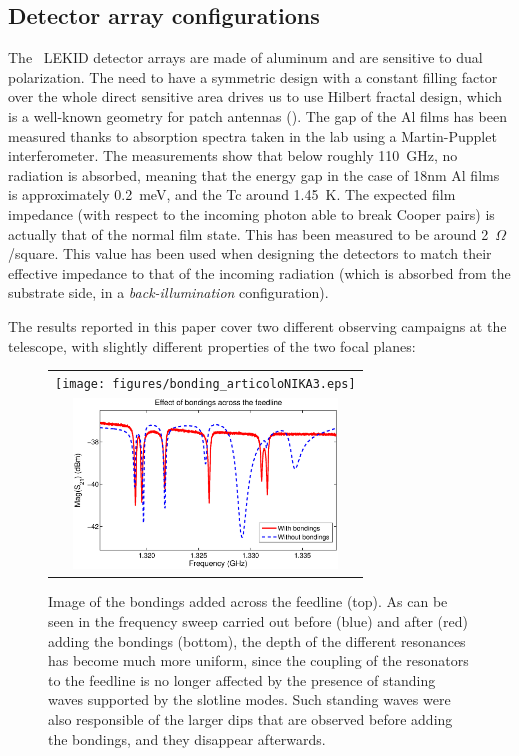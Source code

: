 %

\subsection{Detector array configurations}\label{dac}
The \NIKA\ LEKID detector arrays are made of aluminum and are sensitive to dual polarization. The need to have a symmetric design with a constant filling factor over the whole direct sensitive area drives us to use Hilbert fractal design, which is a well-known geometry for patch antennas (\cite{Roesch2012}). The gap of the Al films has been measured thanks to absorption spectra taken in the lab using a Martin-Pupplet interferometer. The measurements show that below roughly 110~GHz, no radiation is absorbed, meaning that the energy gap in the case of 18nm Al films is approximately 0.2~meV, and the Tc around 1.45~K. The expected film impedance (with respect to the incoming photon able to break Cooper pairs) is actually that of the normal film state. This has been measured to be around 2~$\Omega$/square. This value has been used when designing the detectors to match their effective impedance to that of the incoming radiation (which is absorbed from the substrate side, in a \textit{back-illumination} configuration).

The results reported in this paper cover two different observing campaigns at the telescope, with slightly different properties of the two focal planes:


\begin{figure}[t!]
\begin{center}
\begin{tabular}{c}
\hspace{0.5cm}
\texttt{[image: figures/bonding\_articoloNIKA3.eps]}\\
\includegraphics[bb = 2 238 562 598,width=7cm,clip]{figures/sweep_beforeAndAfterBondings.eps}
\end{tabular}
\end{center}
\caption{Image of the bondings added across the feedline (top). As can be seen
  in the frequency sweep carried out before  (blue) and after (red) adding the bondings
  (bottom), the depth of the different resonances has become much more
  uniform, since the coupling of the resonators to the feedline is no longer
  affected by the presence of standing waves supported by the slotline
  modes. Such standing waves were also responsible of the larger dips that are
  observed before adding the bondings, and they disappear afterwards.}
\label{fig:bondings}
\end{figure}

